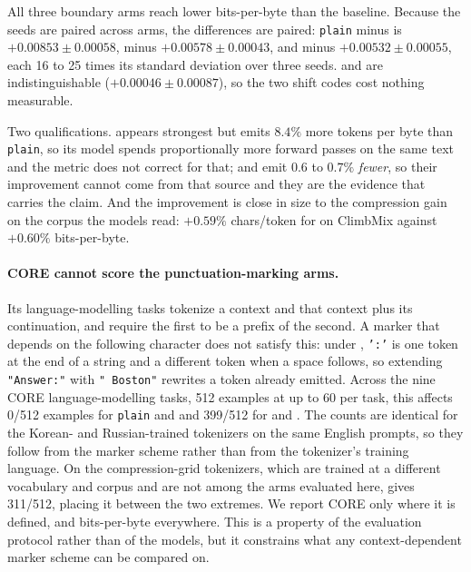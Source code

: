 All three boundary arms reach lower bits-per-byte than the baseline. Because the seeds are
paired across arms, the differences are paired: \texttt{plain} minus  is
$+0.00853 \pm 0.00058$, minus  $+0.00578 \pm 0.00043$, and minus 
$+0.00532 \pm 0.00055$, each 16 to 25 times its standard deviation over three seeds.
 and  are indistinguishable ($+0.00046 \pm 0.00087$), so the two
shift codes cost nothing measurable.

Two qualifications.  appears strongest but emits $8.4\%$ more tokens per byte than
\texttt{plain}, so its model spends proportionally more forward passes on the same text and
the metric does not correct for that;  and  emit $0.6$ to $0.7\%$
\emph{fewer}, so their improvement cannot come from that source and they are the evidence
that carries the claim. And the improvement is close in size to the compression gain on the
corpus the models read: $+0.59\%$ chars/token for  on ClimbMix against $+0.60\%$
bits-per-byte.

\paragraph{CORE cannot score the punctuation-marking arms.} Its language-modelling tasks
tokenize a context and that context plus its continuation, and require the first to be a
prefix of the second. A marker that depends on the following character does not satisfy this:
under , \texttt{':'} is one token at the end of a string and a different token when a
space follows, so extending \texttt{"Answer:"} with \texttt{" Boston"} rewrites a token
already emitted. Across the nine CORE language-modelling tasks, 512 examples at up to 60 per
task, this affects 0/512 examples for \texttt{plain} and  and 399/512 for 
and . The counts are identical for the Korean- and Russian-trained tokenizers
on the same English prompts, so they follow from the marker scheme rather than from the
tokenizer's training language. On the compression-grid tokenizers, which are trained at a
different vocabulary and corpus and are not among the arms evaluated here,  gives
311/512, placing it between the two extremes. We report CORE
only where it is defined, and bits-per-byte everywhere. This is a property of the evaluation
protocol rather than of the models, but it constrains what any context-dependent marker scheme
can be compared on.
